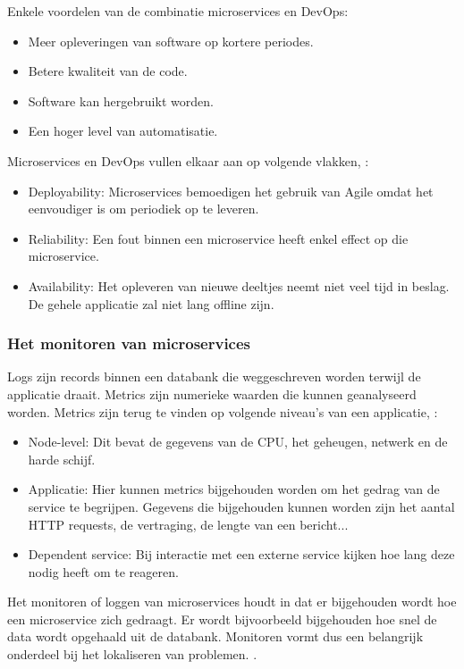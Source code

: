 Enkele voordelen van de combinatie microservices en DevOps:
\begin{itemize}
	\item Meer opleveringen van software op kortere periodes.
	\item Betere kwaliteit van de code.
	\item Software kan hergebruikt worden.
	\item Een hoger level van automatisatie.
\end{itemize}

Microservices en DevOps vullen elkaar aan op volgende vlakken, \textcite{Mulesoft2019}:
\begin{itemize}
	\item Deployability: Microservices bemoedigen het gebruik van Agile omdat het eenvoudiger is om periodiek op te leveren. 
	\item Reliability: Een fout binnen een microservice heeft enkel effect op die microservice. 
	\item Availability: Het opleveren van nieuwe  deeltjes neemt niet veel tijd in beslag. De gehele applicatie zal niet lang offline zijn.
\end{itemize}




\subsubsection{Het monitoren van microservices}
Logs zijn records binnen een databank die weggeschreven worden terwijl de applicatie draait. Metrics zijn numerieke waarden die kunnen geanalyseerd worden. Metrics zijn terug te vinden op volgende niveau's van een applicatie, \textcite{Wasson2018}:
\begin{itemize}
	\item Node-level: Dit bevat de gegevens van de CPU, het geheugen, netwerk en de harde schijf. 
	\item Applicatie: Hier kunnen metrics bijgehouden worden om het gedrag van de service te begrijpen. Gegevens die bijgehouden kunnen worden zijn het aantal HTTP requests, de vertraging, de lengte van een bericht...
	\item Dependent service: Bij interactie met een externe service kijken hoe lang deze nodig heeft om te reageren. 
\end{itemize}


Het monitoren of loggen van microservices houdt in dat er bijgehouden wordt hoe een microservice zich gedraagt. Er wordt bijvoorbeeld bijgehouden hoe snel de data wordt opgehaald uit de databank. Monitoren vormt dus een belangrijk onderdeel bij het lokaliseren van problemen. \textcite{Ananthasubramanian2018}.


